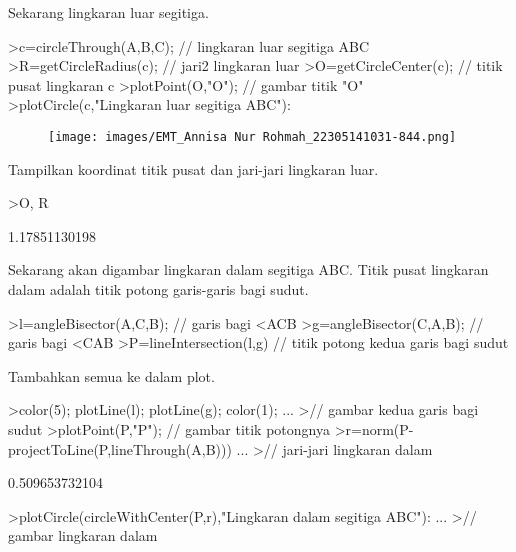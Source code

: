 \documentclass[a4paper,10pt]{article}
\begin{document}
\begin{eulernotebook}
\begin{eulercomment}
\begin{eulercomment}
\begin{eulercomment}
Sekarang lingkaran luar segitiga.
\end{eulercomment}
\begin{eulerprompt}
>c=circleThrough(A,B,C); // lingkaran luar segitiga ABC
>R=getCircleRadius(c); // jari2 lingkaran luar 
>O=getCircleCenter(c); // titik pusat lingkaran c 
>plotPoint(O,"O"); // gambar titik "O"
>plotCircle(c,"Lingkaran luar segitiga ABC"):
\end{eulerprompt}
\begin{figure}[h]
    \centering
    \texttt{[image: images/EMT\_Annisa Nur Rohmah\_22305141031-844.png]}
\end{figure}
\begin{eulercomment}
Tampilkan koordinat titik pusat dan jari-jari lingkaran luar.
\end{eulercomment}
\begin{eulerprompt}
>O, R
\end{eulerprompt}
\begin{euleroutput}
  [1.16667,  1.16667]
  1.17851130198
\end{euleroutput}
\begin{eulercomment}
Sekarang akan digambar lingkaran dalam segitiga ABC. Titik pusat
lingkaran dalam adalah titik potong garis-garis bagi sudut.
\end{eulercomment}
\begin{eulerprompt}
>l=angleBisector(A,C,B); // garis bagi <ACB
>g=angleBisector(C,A,B); // garis bagi <CAB
>P=lineIntersection(l,g) // titik potong kedua garis bagi sudut
\end{eulerprompt}
\begin{euleroutput}
  [0.86038,  0.86038]
\end{euleroutput}
\begin{eulercomment}
Tambahkan semua ke dalam plot.
\end{eulercomment}
\begin{eulerprompt}
>color(5); plotLine(l); plotLine(g); color(1);  ...
>// gambar kedua garis bagi sudut
>plotPoint(P,"P"); // gambar titik potongnya
>r=norm(P-projectToLine(P,lineThrough(A,B)))  ...
>// jari-jari lingkaran dalam
\end{eulerprompt}
\begin{euleroutput}
  0.509653732104
\end{euleroutput}
\begin{eulerprompt}
>plotCircle(circleWithCenter(P,r),"Lingkaran dalam segitiga ABC"):  ...
>// gambar lingkaran dalam
\end{eulerprompt}
\begin{euleroutput}

\end{euleroutput}
\end{eulercomment}
\end{eulercomment}
\end{eulernotebook}
\end{document}
